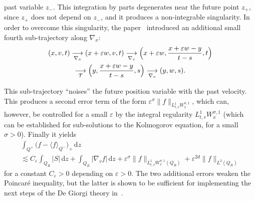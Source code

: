 \documentclass[10pt]{amsart}
\theoremstyle{definition}
\newcommand{\cT}{{\mathcal T}}
\newcommand{\dd}{{\, \mathrm d}}
\let\var\varepsilon
\begin{document}
past variable $z_-$. This integration by parts degenerates near
the future point $z_+$, since $z_+$ does not depend on $z_-$, and
it produces a non-integrable singularity. In order to overcome
this singularity, the paper~\cite{guerand-mouhot} introduced an
additional small fourth sub-trajectory along $\nabla_x$:
\begin{multline*}
(x,v,t)
\underset{\nabla_x}{\longrightarrow}
(x+\varepsilon w,v,t) \underset{\nabla_v}{\longrightarrow}
\Bigl(x+\varepsilon w, \frac{x+\varepsilon w
-y}{t-s},t \Bigr) \\
\underset{\cT}{\longrightarrow} \Bigl(y,\frac{x+\varepsilon w
-y}{t-s},s\Bigr) \underset{\nabla_v}{\longrightarrow}
(y,w,s).
\end{multline*}

This sub-trajectory ``noises'' the future position variable with
the past velocity. This produces a second error term of the form
$\var^\sigma \| f \|_{L^1_{t,v} W^{\sigma,1}_x}$, which can, however,
be controlled for a small $\var$ by the
integral regularity $L^1_{t,v} W^{\sigma,1}_{x}$ (which can be
established for sub-solutions to the Kolmogorov equation, for a
small $\sigma>0$). Finally it
yields
\begin{multline*}
\int_{Q^+} \big(f - \langle
f\rangle_{Q^-}\big)_+ \dd z\\
\lesssim
C_\var \int_{Q_R} \big\vert S\big\vert \dd z +
\int_{Q_R} \big\vert \nabla_v f\big\vert \dd z + \var^\sigma \| f
\|_{L^1_{t,v} W^{\sigma,1}_x(Q_R)} + \var^{2d} \|f\|_{L^2(Q_R)}
\end{multline*}
for a constant $C_\var >0$ depending on $\var>0$. The two
additional errors weaken the Poincaré inequality, but the latter
is shown to be sufficient for implementing the next steps of the
De Giorgi theory in~\cite{guerand-mouhot}.
\end{document}
